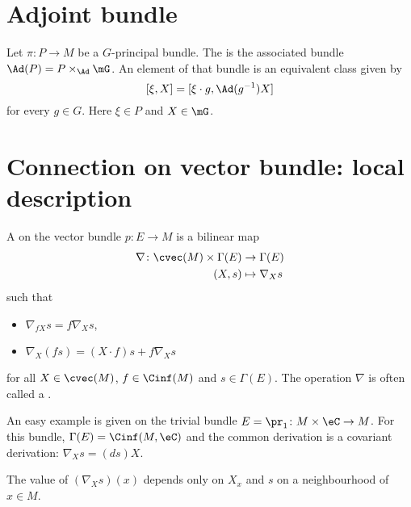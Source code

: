 

\section{Adjoint bundle}

Let $\pi\colon P\to M$ be a $G$-principal bundle. The  is the associated bundle $\Ad(P)=P\times_{\Ad}\mG$. An element of that bundle is an equivalent class given by
\[
	[\xi,X]=[\xi\cdot g,\Ad(g^{-1})X]
\]
for every $g\in G$. Here $\xi\in P$ and $X\in\mG$.

\section{Connection on vector bundle: local description}\label{sec:conn_vect}

\begin{definition}      \label{DEFooIESVooGNQHzl}
	A  on the vector bundle $p\colon E\to M$ is a bilinear map
	\begin{equation}
		\begin{aligned}
			\nabla \colon \cvec(M)\times\Gamma(E) & \to \Gamma(E)     \\
			(X,s)                                 & \mapsto \nabla_Xs
		\end{aligned}
	\end{equation}
	such that
	\begin{itemize}
		\item $\nabla_{fX}s=f\nabla_Xs$,
		\item $\nabla_X(fs)=(X\cdot f)s+f\nabla_Xs$
	\end{itemize}
	for all $X\in\cvec(M)$, $f\in\Cinf(M)$ and $s\in\Gamma(E)$. The operation $\nabla$ is often called a .
\end{definition}

An easy example is given on the trivial bundle $E=\pr_1\colon M\times\eC\to M$. For this bundle, $\Gamma(E)=\Cinf(M,\eC)$ and the common derivation is a covariant derivation: $\nabla_Xs=(ds)X$.

\begin{proposition}     \label{PROPooWZYOooEVhgFt}
	The value of $(\nabla_Xs)(x)$ depends only on $X_x$ and $s$ on a neighbourhood of $x\in M$.
\end{proposition}

